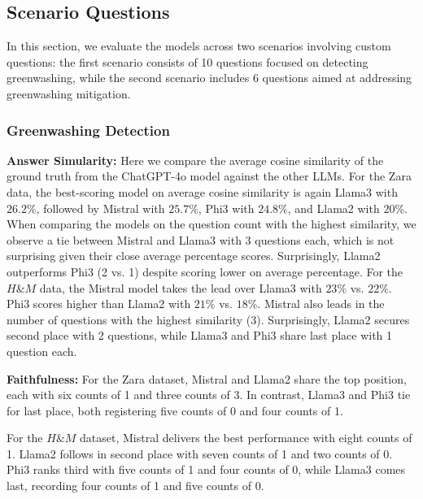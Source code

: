 \documentclass[]{article}
\begin{document}
\subsection{Scenario Questions}
In this section, we evaluate the models across two scenarios involving custom questions: 
the first scenario consists of 10 questions focused on detecting greenwashing, 
while the second scenario includes 6 questions aimed at addressing greenwashing mitigation.

\subsubsection{Greenwashing Detection}
\textbf{Answer Simularity:} Here we compare the average cosine similarity of the ground truth from the ChatGPT-4o model against the other LLMs.
For the Zara data, the best-scoring model on average cosine similarity is again Llama3 with $26.2\%$, followed by Mistral with $25.7\%$, Phi3 with $24.8\%$, and Llama2 with $20\%$.  
When comparing the models on the question count with the highest similarity, we observe a tie between Mistral and Llama3 with 3 questions each, which is not surprising given their close average percentage scores. Surprisingly, Llama2 outperforms Phi3 (2 vs. 1) despite scoring lower on average percentage.\newline  
For the $H\&M$ data, the Mistral model takes the lead over Llama3 with $23\%$ vs. $22\%$. Phi3 scores higher than Llama2 with $21\%$ vs. $18\%$.  
Mistral also leads in the number of questions with the highest similarity (3). Surprisingly, Llama2 secures second place with 2 questions, while Llama3 and Phi3 share last place with 1 question each.

\textbf{Faithfulness:}
For the Zara dataset, Mistral and Llama2 share the top position, each with six counts of 1 and three counts of 3. In contrast, Llama3 and Phi3 tie for last place, both registering five counts of 0 and four counts of 1.  

For the $H\&M$ dataset, Mistral delivers the best performance with eight counts of 1. Llama2 follows in second place with seven counts of 1 and two counts of 0. Phi3 ranks third with five counts of 1 and four counts of 0, while Llama3 comes last, recording four counts of 1 and five counts of 0.
\end{document}
